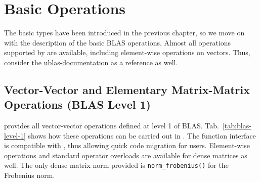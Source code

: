 \chapter{Basic Operations} \label{chap:operations}

The basic types have been introduced in the previous chapter, so we move on with the description of the basic BLAS operations.
Almost all operations supported by {\ublas} are available, including element-wise operations on vectors. Thus, consider the
\href{http://www.boost.org/doc/libs/1_52_0/libs/numeric/ublas/doc/operations_overview.htm}{ublas-documentation} as a reference as well.

\section{Vector-Vector and Elementary Matrix-Matrix Operations (BLAS Level 1)}

{\ViennaCL} provides all vector-vector operations defined at level 1 of BLAS. Tab.~\ref{tab:blas-level-1} shows how these operations can be carried
out in \ViennaCL. The function interface is compatible with {\ublas},
thus allowing quick code migration for {\ublas} users.
Element-wise operations and standard operator overloads are available for dense matrices as well.
The only dense matrix norm provided is \lstinline|norm_frobenius()| for the Frobenius norm.




